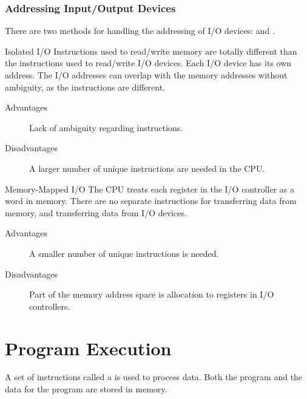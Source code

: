 \documentclass[../notes.tex]{subfiles}
\begin{document}
				\subsubsection{Addressing Input/Output Devices}
					There are two methods for handling the addressing of I/O devices:  and .
					\begin{definition}{Isolated I/O}
						Instructions used to read/write memory are totally different than the instructions used to read/write I/O devices. Each I/O device has its own address. The I/O addresses can overlap with the memory addresses without ambiguity, as the instructions are different.
						\begin{description}
							\item[Advantages] Lack of ambiguity regarding instructions.
							\item[Disadvantages] A larger number of unique instructions are needed in the CPU.
						\end{description}
					\end{definition}
					\begin{definition}{Memory-Mapped I/O}
						The CPU treats each register in the I/O controller as a word in memory. There are no separate instructions for transferring data from memory, and transferring data from I/O devices.
						\begin{description}
							\item[Advantages] A smaller number of unique instructions is needed.
							\item[Disadvantages] Part of the memory address space is allocation to registers in I/O controllers.
						\end{description}
					\end{definition}
			\section{Program Execution}
				A set of instructions called a  is used to process data. Both the program and the data for the program are stored in memory.
\end{document}
